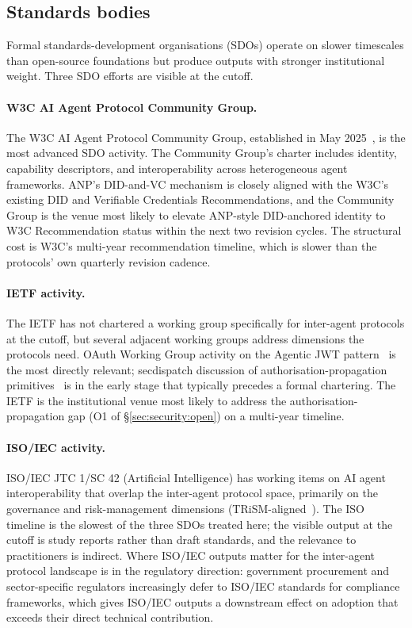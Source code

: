 \subsection{Standards bodies}
\label{sec:governance:sdos}

Formal standards-development organisations (SDOs)
operate on slower timescales than open-source
foundations but produce outputs with stronger institutional
weight. Three SDO efforts are visible at the cutoff.

\paragraph{W3C AI Agent Protocol Community Group.}
The W3C AI Agent Protocol Community Group, established in
May 2025~\cite{w3c_agent_protocol_cg}, is the most
advanced SDO activity. The Community Group's charter
includes identity, capability descriptors, and
interoperability across heterogeneous agent
frameworks. ANP's DID-and-VC mechanism is closely
aligned with the W3C's existing DID and Verifiable
Credentials Recommendations, and the Community Group is
the venue most likely to elevate ANP-style DID-anchored
identity to W3C Recommendation status within the next
two revision cycles. The structural cost is W3C's
multi-year recommendation timeline, which is slower than
the protocols' own quarterly revision cadence.

\paragraph{IETF activity.}
The IETF has not chartered a working group specifically
for inter-agent protocols at the cutoff, but several
adjacent working groups address dimensions the protocols
need. OAuth Working Group activity on the
Agentic JWT pattern~\cite{agentic_jwt} is the most
directly relevant; secdispatch discussion of
authorisation-propagation primitives~\cite{authz_propagation}
is in the early stage that typically precedes a formal
chartering. The IETF is the institutional venue most
likely to address the authorisation-propagation gap
(O1 of \S\ref{sec:security:open}) on a multi-year
timeline.

\paragraph{ISO/IEC activity.}
ISO/IEC JTC 1/SC 42 (Artificial Intelligence) has
working items on AI agent interoperability that
overlap the inter-agent protocol space, primarily on
the governance and risk-management dimensions
(TRiSM-aligned~\cite{trism}). The ISO timeline is the
slowest of the three SDOs treated here; the visible
output at the cutoff is study reports rather than
draft standards, and the relevance to practitioners is
indirect. Where ISO/IEC outputs matter for the
inter-agent protocol landscape is in the regulatory
direction: government procurement and
sector-specific regulators increasingly defer to
ISO/IEC standards for compliance frameworks, which
gives ISO/IEC outputs a downstream effect on adoption
that exceeds their direct technical
contribution.


